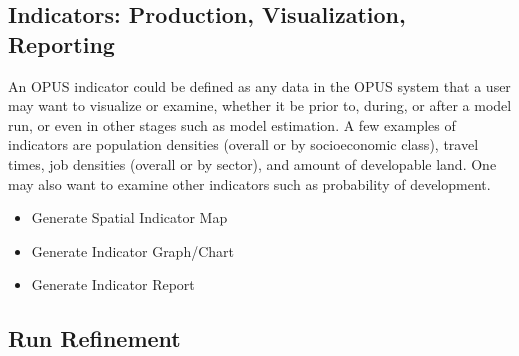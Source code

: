 \subsection{Indicators: Production, Visualization, Reporting}

An OPUS indicator could be defined as any data in the OPUS system that a user
may want to visualize or examine, whether it be prior to, during, or after a
model run, or even in other stages such as model estimation.  A few examples
of indicators are population densities (overall or by socioeconomic class),
travel times, job densities (overall or by sector), and amount of developable
land.  One may also want to examine other indicators such as probability of
development.

\begin{itemize}
    \item Generate Spatial Indicator Map
    \item Generate Indicator Graph/Chart
    \item Generate Indicator Report
\end{itemize}

\subsection{Run Refinement}
